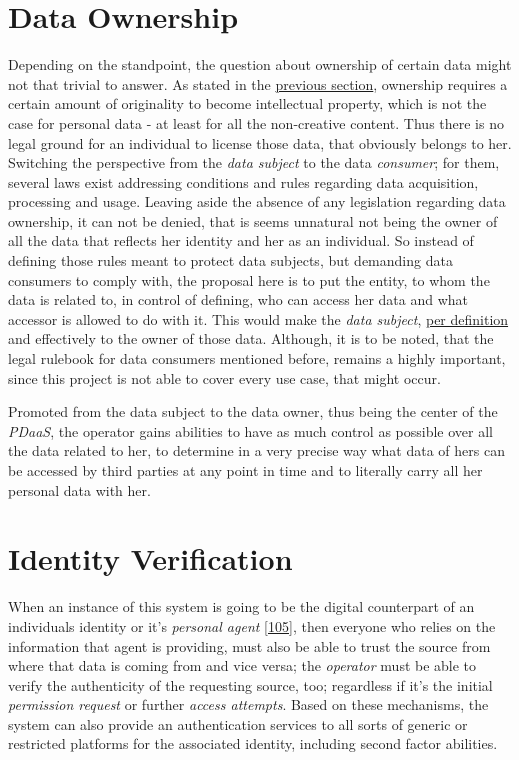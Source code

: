 \documentclass[12pt,english,a4paper,titlepage,cleardoublepage=empty,dottedtoc]{report}
\begin{document}
\section{Data Ownership}\label{data-ownership}

Depending on the standpoint, the question about ownership of certain
data might not that trivial to answer. As stated in the
\protect\hyperlink{digital-identity-personal-data-and-ownership}{previous
section}, ownership requires a certain amount of originality to become
intellectual property, which is not the case for personal data - at
least for all the non-creative content. Thus there is no legal ground
for an individual to license those data, that obviously belongs to her.
Switching the perspective from the \emph{data subject} to the data
\emph{consumer}; for them, several laws exist addressing conditions and
rules regarding data acquisition, processing and usage. Leaving aside
the absence of any legislation regarding data ownership, it can not be
denied, that is seems unnatural not being the owner of all the data that
reflects her identity and her as an individual. So instead of defining
those rules meant to protect data subjects, but demanding data consumers
to comply with, the proposal here is to put the entity, to whom the data
is related to, in control of defining, who can access her data and what
accessor is allowed to do with it. This would make the \emph{data
subject}, \protect\hyperlink{def-ownership}{per definition} and
effectively to the owner of those data. Although, it is to be noted,
that the legal rulebook for data consumers mentioned before, remains a
highly important, since this project is not able to cover every use
case, that might occur.

Promoted from the data subject to the data owner, thus being the center
of the \emph{PDaaS}, the operator gains abilities to have as much
control as possible over all the data related to her, to determine in a
very precise way what data of hers can be accessed by third parties at
any point in time and to literally carry all her personal data with her.

\section{Identity Verification}\label{identity-verification}

When an instance of this system is going to be the digital counterpart
of an individuals identity or it's \emph{personal agent}
{[}\protect\hyperlink{ref-book_2015_ethical-it-innovation}{105}{]}, then
everyone who relies on the information that agent is providing, must
also be able to trust the source from where that data is coming from and
vice versa; the \emph{operator} must be able to verify the authenticity
of the requesting source, too; regardless if it's the initial
\emph{permission request} or further \emph{access attempts}. Based on
these mechanisms, the system can also provide an authentication services
to all sorts of generic or restricted platforms for the associated
identity, including second factor abilities.
\end{document}
